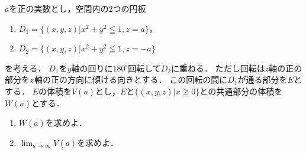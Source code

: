 \documentclass[../../main.tex]{subfiles}
\begin{document}
$a$を正の実数とし，空間内の2つの円板
\begin{enumerate}
  \item []$D_1=\{(x,y,z)|x^2+y^2\leqq1,z=a\}$，
  \item []$D_2=\{(x,y,z)|x^2+y^2\leqq1,z=-a \}$
\end{enumerate}
を考える．
$D_1$を$y$軸の回りに${180}^\circ$回転して$D_2$に重ねる．
ただし回転は$z$軸の正の部分を$x$軸の正の方向に傾ける向きとする．
この回転の間に$D_1$が通る部分を$E$とする．
$E$の体積を$V(a)$とし，$E$と$\{(x,y,z)|x\geqq0\}$との共通部分の体積を$W(a)$とする．
\begin{enumerate}
  \item $W(a)$を求めよ．
  \item $\displaystyle\lim_{a\to\infty}V(a)$を求めよ．
\end{enumerate}
\end{document}
